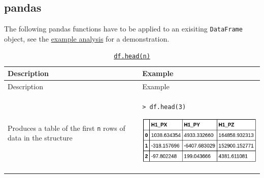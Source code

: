\documentclass[10pt,a4paperpaper,]{article}
\begin{document}
\subsection{pandas}\label{pandas}

The following pandas functions have to be applied to an exisiting
\texttt{DataFrame} object, see the
\href{https://github.com/lhcb/opendata-project/blob/master/Example-Analysis.ipynb}{example
analysis} for a demonstration.

\begin{longtable}[]{@{}ll@{}}
\caption{\href{http://pandas.pydata.org/pandas-docs/stable/generated/pandas.DataFrame.head.html}{\texttt{df.head(n)}}}\tabularnewline
\toprule
\begin{minipage}[b]{0.47\columnwidth}\raggedright\strut
Description
\strut\end{minipage} &
\begin{minipage}[b]{0.47\columnwidth}\raggedright\strut
Example
\strut\end{minipage}\tabularnewline
\midrule
\endfirsthead
\toprule
\begin{minipage}[b]{0.47\columnwidth}\raggedright\strut
Description
\strut\end{minipage} &
\begin{minipage}[b]{0.47\columnwidth}\raggedright\strut
Example
\strut\end{minipage}\tabularnewline
\midrule
\endhead
\begin{minipage}[t]{0.47\columnwidth}\raggedright\strut
Produces a table of the first \texttt{n} rows of data in the structure
\strut\end{minipage} &
\begin{minipage}[t]{0.47\columnwidth}\raggedright\strut
\texttt{\textgreater{}\ df.head(3)}

\includegraphics[width=\textwidth]{assets/04-head.png}
\strut\end{minipage}\tabularnewline
\bottomrule
\end{longtable}
\end{document}
